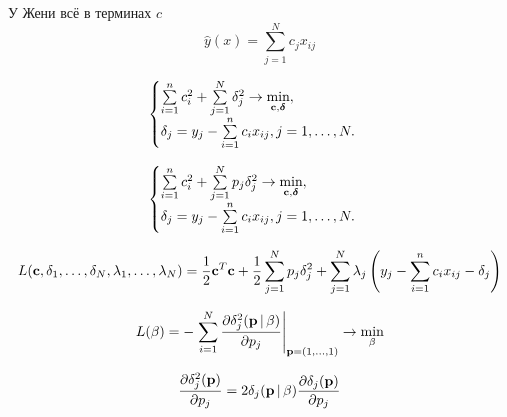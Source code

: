 
У Жени всё в терминах $c$
$$
\hat y(x) = \sum_{j=1}^N c_j x_{ij}
$$

\begin{equation}
	\label{basicENdelta}
	\begin{cases}
		\sum\limits_{i=1}^n c_i^2 + \sum\limits_{j=1}^N \delta_j^2 \to \mathop{\mbox{min}}\limits_{\boldsymbol{\mathbf{c}}, \boldsymbol{\mathbf{\delta}}}, \\
	\delta_j = y_j - \sum\limits_{i=1}^n c_ix_{ij}, j=1,\ldots,N. 
	\end{cases}
\end{equation}

\begin{equation}
	\label{basicENdelta}
	\begin{cases}
		\sum\limits_{i=1}^n c_i^2 + \sum\limits_{j=1}^N p_j\delta_j^2 \to \mathop{\mbox{min}}\limits_{\boldsymbol{\mathbf{c}}, \boldsymbol{\mathbf{\delta}}}, \\
	\delta_j = y_j - \sum\limits_{i=1}^n c_ix_{ij}, j=1,\ldots,N. 
	\end{cases}
\end{equation}



\begin{equation}
L(\boldsymbol{\mathbf{c}},\delta_{1},\ldots,\delta_{N}, \lambda_{1},\ldots,\lambda_{N}) 
	= \frac12 \boldsymbol{\mathbf{c}}^T\boldsymbol{\mathbf{c}} +  \frac12 \sum\limits_{j=1}^N p_j\delta_j^2 + \sum_{j=1}^N\lambda_j\left(y_j  - \sum\limits_{i=1}^n c_i x_{ij} - \delta_j \right)
\end{equation}

\begin{equation}
L(\beta) = - \left.\sum_{i=1}^N \frac{\partial\delta_j^2(\boldsymbol{\mathbf{p}}\,|\, \beta)}{\partial p_j}\right|_{\boldsymbol{\mathbf{p}} = (1, \ldots, 1)} \to \mathop{\mbox{min}}\limits_{\beta}
\end{equation}

\begin{equation}
\frac{\partial\delta_j^2(\boldsymbol{\mathbf{p}})}{\partial p_j} = 2 \delta_j(\boldsymbol{\mathbf{p}}\,|\, \beta)\frac{\partial\delta_j(\boldsymbol{\mathbf{p}})}{\partial p_j} 
\end{equation}

